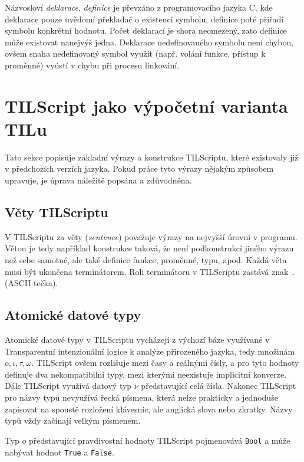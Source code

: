 Názvosloví \textit{deklarace}, \textit{definice} je převzáno z programovacího jazyka C, kde
deklarace pouze uvědomí překladač o existenci symbolu, definice poté přiřadí symbolu konkrétní
hodnotu. Počet deklarací je shora neomezený, zato definice může existovat nanejvýš jedna. Deklarace
nedefinovaného symbolu není chybou, ovšem snaha nedefinovaný symbol využít (např. volání funkce,
přístup k proměnné) vyústí v chybu při procesu linkování.

\section{TILScript jako výpočetní varianta TILu}

Tato sekce popisuje základní výrazy a konstrukce TILScriptu, které existovaly již v předchozích
verzích jazyka. Pokud práce tyto výrazy nějakým způsobem upravuje, je úprava náležitě popsána
a zdůvodněna.

\subsection{Věty TILScriptu}

V TILScriptu za věty (\textit{sentence}) považuje výrazy na nejvyšší úrovni v programu. Větou je
tedy například konstrukce taková, že není podkonstrukcí jiného výrazu než sebe samotné, ale také
definice funkce, proměnné, typu, apod. Každá věta musí být ukončena terminátorem. Roli terminátoru
v TILScriptu zastává znak \lstinline{.} (ASCII tečka).

\subsection{Atomické datové typy}

Atomické datové typy v TILScriptu vycházejí z výchozí báze využívané v Transparentní intenzionální
logice k analýze přirozeného jazyka, tedy množinám ${o, \iota, \tau, \omega}$. TILScript ovšem
rozlišuje mezi časy a reálnými čísly, a pro tyto hodnoty definuje dva nekompatibilní typy, mezi
kterými neexistuje implicitní konverze. Dále TILScript využívá datový typ $\nu$ představující celá
čísla. Nakonec TILScript pro názvy typů nevyužívá řecká písmena, která nelze prakticky a jednoduše
zapisovat na spoustě rozložení klávesnic, ale anglická slova nebo zkratky. Názvy typů vždy začínají
velkým písmenem.

Typ $o$ představující pravdivostní hodnoty TILScript pojmenovává \lstinline{Bool} a může nabývat
hodnot \lstinline{True} a \lstinline{False}.

